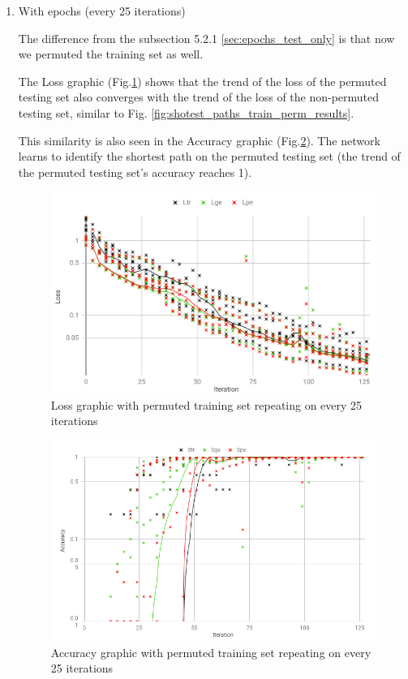 \begin{enumerate}[label=(\Alph*)]
        \item With epochs (every 25 iterations)
        
        The difference from the subsection 5.2.1 \ref{sec:epochs_test_only} is that now we permuted the training set as well.
        
        The Loss graphic (Fig.\ref{fig:shotest_paths_epochs_perm_results}) shows that the trend of the loss of the permuted testing set also converges with the trend of the loss of the non-permuted testing set, similar to Fig. \ref{fig:shotest_paths_train_perm_results}.
        
        This similarity is also seen in the Accuracy graphic (Fig.\ref{fig:shotest_paths_epochs_perm_ACC_results}). The network learns to identify the shortest path on the permuted testing set (the trend of the permuted testing set's accuracy reaches 1).
        
        \begin{figure}[H]
            \centering
            \includegraphics[width=.9\linewidth]{fig/content/results/shortest_path/epochs_perm.png}
            \caption{Loss graphic with permuted training set repeating on every 25 iterations}
            \label{fig:shotest_paths_epochs_perm_results}
        \end{figure}
        
        \begin{figure}[H]
            \centering
            \includegraphics[width=.9\linewidth]{fig/content/results/shortest_path/epochs_perm_ACC.png}
            \caption{Accuracy graphic with permuted training set repeating on every 25 iterations}
            \label{fig:shotest_paths_epochs_perm_ACC_results}
        \end{figure}
        

\end{enumerate}
